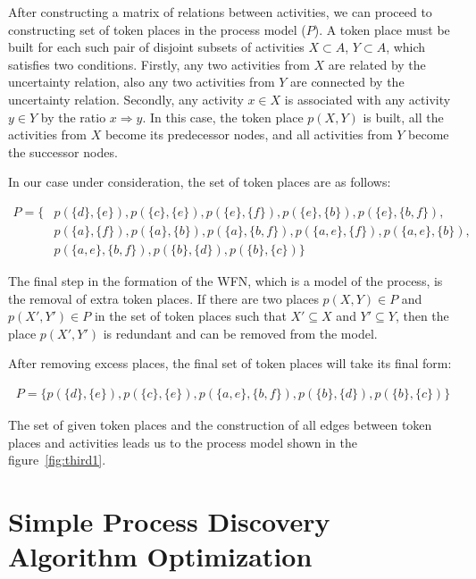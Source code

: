 \documentclass[
11pt,%
tightenlines,%
twoside,%
onecolumn,%
nofloats,%
nobibnotes,%
nofootinbib,%
superscriptaddress,%
noshowpacs,%
centertags]%
{revtex4}
\begin{document}
After constructing a matrix of relations between activities, we can proceed to constructing set of token places in the process model ($P$).
A token place must be built for each such pair of disjoint subsets of activities $X \subset A$, $Y \subset A$, which satisfies two conditions.
Firstly, any two activities from $X$ are related by the uncertainty relation, also any two activities from $Y$ are connected by the uncertainty relation.
Secondly, any activity $x \in X$ is associated with any activity $y \in Y$ by the ratio $x \Rightarrow y$.
In this case, the token place $p(X, Y)$ is built, all the activities from $X$ become its predecessor nodes, and all activities from $Y$ become the successor nodes.

In our case under consideration, the set of token places are as follows:

\begin{equation}\label{eqn:p1}
\begin{aligned}
P = \{
& p(\{d\}, \{e\}),
p(\{c\}, \{e\}),
p(\{e\}, \{f\}),
p(\{e\}, \{b\}),
p(\{e\}, \{b, f\}), \\
& p(\{a\}, \{f\}),
p(\{a\}, \{b\}),
p(\{a\}, \{b, f\}),
p(\{a, e\}, \{f\}),
p(\{a, e\}, \{b\}), \\
& p(\{a, e\}, \{b, f\}),
p(\{b\}, \{d\}),
p(\{b\}, \{c\})
\}
\end{aligned}
\end{equation}

The final step in the formation of the WFN, which is a model of the process, is the removal of extra token places.
If there are two places $p(X, Y) \in P$ and $p(X ', Y') \in P$ in the set of token places such that $X' \subseteq X$ and $Y' \subseteq Y$, then the place $p(X', Y')$ is redundant and can be removed from the model.

After removing excess places, the final set of token places will take its final form:

\begin{equation}\label{eqn:p2}
\begin{aligned}
P = \{
p(\{d\}, \{e\}), p(\{c\}, \{e\}), p(\{a, e\}, \{b, f\}), p(\{b\}, \{d\}), p(\{b\}, \{c\})
\}
\end{aligned}
\end{equation}

The set of given token places and the construction of all edges between token places and activities leads us to the process model shown in the figure~\ref{fig:third1}.

\section{Simple Process Discovery Algorithm Optimization}
\end{document}
